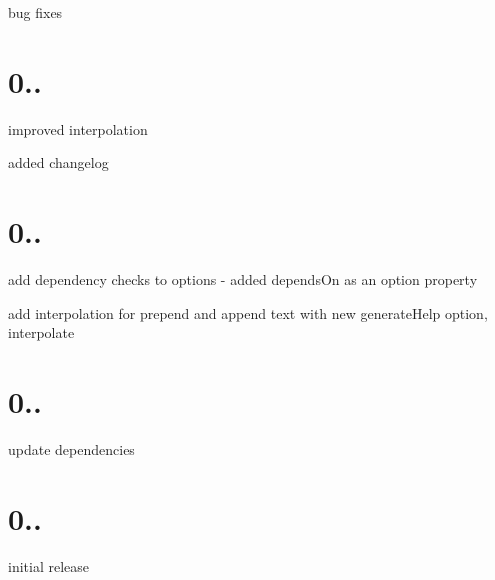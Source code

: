 \begin{DoxyItemize}
\item bug fixes
\end{DoxyItemize}

\section*{0..}


\begin{DoxyItemize}
\item improved interpolation
\item added changelog
\end{DoxyItemize}

\section*{0..}


\begin{DoxyItemize}
\item add dependency checks to options -\/ added {\ttfamily depends\+On} as an option property
\item add interpolation for {\ttfamily prepend} and {\ttfamily append} text with new {\ttfamily generate\+Help} option, {\ttfamily interpolate}
\end{DoxyItemize}

\section*{0..}


\begin{DoxyItemize}
\item update dependencies
\end{DoxyItemize}

\section*{0..}


\begin{DoxyItemize}
\item initial release 
\end{DoxyItemize}